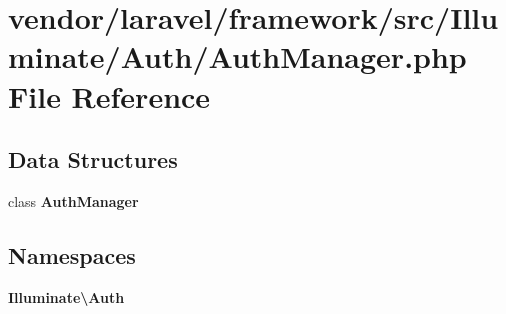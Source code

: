 \section{vendor/laravel/framework/src/\+Illuminate/\+Auth/\+Auth\+Manager.php File Reference}
\label{_auth_manager_8php}
\subsection*{Data Structures}
\begin{DoxyCompactItemize}
\item 
class {\bf Auth\+Manager}
\end{DoxyCompactItemize}
\subsection*{Namespaces}
\begin{DoxyCompactItemize}
\item 
 {\bf Illuminate\textbackslash{}\+Auth}
\end{DoxyCompactItemize}
